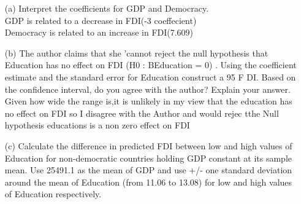 \documentclass[12pt,letterpaper]{article}
\begin{document}
	
	\vspace{.5cm}
	\begin{enumerate}
	\item [(a)] Interpret the coefficients for GDP and Democracy.\\
	GDP is related to a decrease in FDI(-3 coeffecient)\\
	Democracy is related to an increase in FDI(7.609)
	
	
	
	
	\item [(b)] The author claims that she ’cannot reject the null hypothesis that Education has no
	effect on FDI (H0 : BEducation = 0) . Using the coefficient estimate and the standard
	error for Education construct a 95%
	F DI. Based on the confidence interval, do you agree with the author? Explain your
	answer.\\
	Given how wide the range is,it is unlikely in my view that the education has 
	no effect on FDI so I disagree with the Author and would rejec tthe Null hypothesis
	educations is a non zero effect on FDI
		  
	
	
	
	\vspace{2cm}
	\item [(c)] Calculate the difference in predicted FDI between low and high values of Education for
	non-democratic countries holding GDP constant at its sample mean. Use 25491.1 as
	the mean of GDP and use +/- one standard deviation around the mean of Education
	(from 11.06 to 13.08) for low and high values of Education respectively.
			  
	
	
	\end{enumerate}  
	
	
	
	
\end{document}
